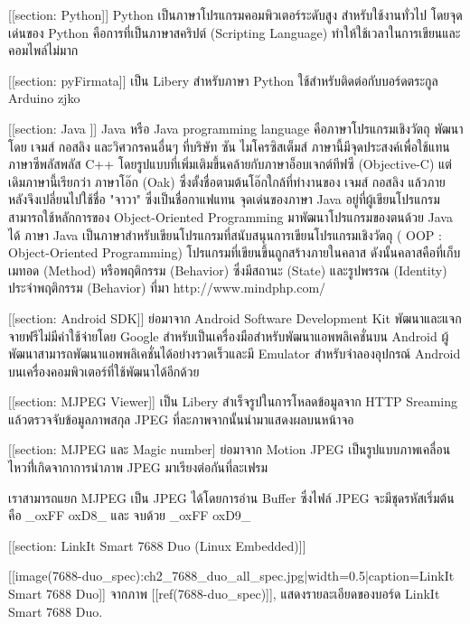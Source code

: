 [[section: Python]] 
	Python เป็นภาษาโปรแกรมคอมพิวเตอร์ระดับสูง สำหรับใช้งานทั่วไป
	โดยจุดเด่นของ Python คือการที่เป็นภาษาสคริปต์ (Scripting Language)
	ทำให้ใช้เวลาในการเขียนและคอมไพล์ไม่มาก

[[section: pyFirmata]]
    เป็น Libery สำหรับภาษา Python ใช้สำหรับติดต่อกับบอร์ดตระกูล Arduino zjko

[[section: Java ]]
    Java หรือ Java programming language คือภาษาโปรแกรมเชิงวัตถุ พัฒนาโดย เจมส์ กอสลิง และวิศวกรคนอื่นๆ ที่บริษัท ซัน ไมโครซิสเต็มส์ ภาษานี้มีจุดประสงค์เพื่อใช้แทนภาษาซีพลัสพลัส C++ โดยรูปแบบที่เพิ่มเติมขึ้นคล้ายกับภาษาอ็อบเจกต์ทีฟซี (Objective-C) แต่เดิมภาษานี้เรียกว่า ภาษาโอ๊ก (Oak) ซึ่งตั้งชื่อตามต้นโอ๊กใกล้ที่ทำงานของ เจมส์ กอสลิง แล้วภายหลังจึงเปลี่ยนไปใช้ชื่อ "จาวา" ซึ่งเป็นชื่อกาแฟแทน จุดเด่นของภาษา Java อยู่ที่ผู้เขียนโปรแกรมสามารถใช้หลักการของ Object-Oriented Programming มาพัฒนาโปรแกรมของตนด้วย Java ได้ 
    ภาษา Java เป็นภาษาสำหรับเขียนโปรแกรมที่สนับสนุนการเขียนโปรแกรมเชิงวัตถุ ( OOP : Object-Oriented Programming) โปรแกรมที่เขียนขึ้นถูกสร้างภายในคลาส ดังนั้นคลาสคือที่เก็บเมทอด (Method) หรือพฤติกรรม (Behavior) ซึ่งมีสถานะ (State) และรูปพรรณ (Identity) ประจำพฤติกรรม (Behavior) 
    ที่มา http://www.mindphp.com/%

[[section: Android SDK]]
    ย่อมาจาก Android Software Development Kit พัฒนาและแจกจายฟรีไม่มีค่าใช้จ่ายโดย Google สำหรับเป็นเครื่องมือสำหรับพัฒนาแอพพลิเคชั่นบน Android ผู้พัฒนาสามารถพัฒนาแอพพลิเคชั่นได้อย่างรวดเร็วและมี Emulator สำหรับจำลองอุปกรณ์ Android บนเครื่องคอมพิวเตอร์ที่ใช้พัฒนาได้อีกด้วย

[[section: MJPEG Viewer]]
    เป็น Libery สำเร็จรูปในการโหลดข้อมูลจาก HTTP Sreaming แล้วตรวจจับข้อมูลภาพสกุล JPEG ที่ละภาพจากนั้นนำมาแสดงผลบนหน้าจอ


[[section: MJPEG และ Magic number]
    ย่อมาจาก Motion JPEG เป็นรูปแบบภาพเคลื่อนไหวที่่เกิดจากาการนำภาพ JPEG มาเรียงต่อกันที่ละเฟรม

    เราสามารถแยก MJPEG เป็น JPEG ได้โดยการอ่าน Buffer ซึ่งไฟล์ JPEG จะมีชุดรหัสเริ่มต้นคือ _oxFF oxD8_ และ จบด้วย _oxFF oxD9_

[[section: LinkIt Smart 7688 Duo (Linux Embedded)]]

    [[image(7688-duo_spec):ch2_7688_duo_all_spec.jpg|width=0.5|caption=LinkIt Smart 7688 Duo]]
    จากภาพ [[ref(7688-duo_spec)]], แสดงรายละเอียดของบอร์ด LinkIt Smart 7688 Duo.

